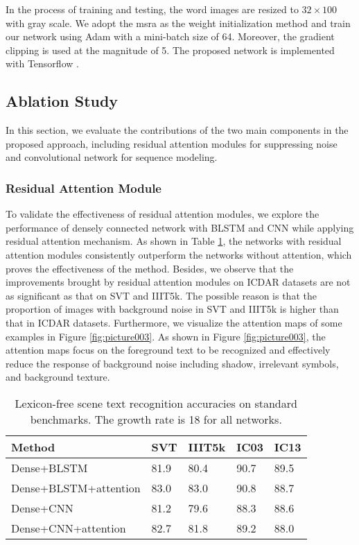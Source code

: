\documentclass[letterpaper]{article} %
\begin{document}
In the process of training and testing, the word images are resized to $32 \times 100$ with gray scale. We adopt the msra \cite{he2015delving} as the weight initialization method and train our network using Adam \cite{kingma2014adam} with a mini-batch size of 64. Moreover, the gradient clipping is used at the magnitude of 5. The proposed network is implemented with Tensorflow \cite{abadi2016tensorflow}.


\subsection{Ablation Study}

In this section, we evaluate the contributions of the two main components in the proposed approach, including residual attention modules for suppressing noise and convolutional network for sequence modeling.



\subsubsection{Residual Attention Module}
To validate the effectiveness of residual attention modules, we explore the performance of densely connected network with BLSTM and CNN while applying residual attention mechanism. As shown in Table \ref{tab:002}, the networks with residual attention modules consistently outperform the networks without attention, which proves the effectiveness of the method. Besides, we observe that the improvements brought by residual attention modules on ICDAR datasets are not as significant as that on SVT and IIIT5k. The possible reason is that the proportion of images with background noise in SVT and IIIT5k is higher than that in ICDAR datasets. Furthermore, we visualize the attention maps of some examples in Figure \ref{fig:picture003}. As shown in Figure \ref{fig:picture003}, the attention maps focus on the foreground text to be recognized and effectively reduce the response of background noise including shadow, irrelevant symbols, and background texture.

\begin{table}
  \centering
  \caption{Lexicon-free scene text recognition accuracies on standard benchmarks. The growth rate is 18 for all networks.}

\begin{tabular}{p{3.5cm}<{\centering} | p{0.6cm}<{\centering} | p{0.75cm}<{\centering} | p{0.6cm}<{\centering} | p{0.55cm}<{\centering}} 
  \hline
  Method&SVT&IIIT5k&IC03&IC13 \\
  \hline
  Dense+BLSTM&81.9&80.4&90.7& 89.5 \\
  Dense+BLSTM+attention&83.0&83.0&90.8&88.7 \\
  \hline
  Dense+CNN&81.2  & 79.6 & 88.3 & 88.6 \\
  Dense+CNN+attention&82.7&81.8&89.2&88.0 \\
  \hline
\end{tabular}
\label{tab:002}
\end{table}
\end{document}
